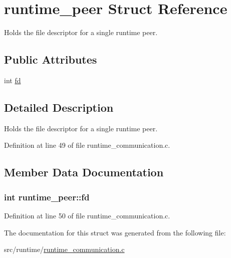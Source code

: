 \hypertarget{structruntime__peer}{\section{runtime\-\_\-peer Struct Reference}
\label{structruntime__peer}
}


Holds the file descriptor for a single runtime peer.  


\subsection*{Public Attributes}
\begin{DoxyCompactItemize}
\item 
int \hyperlink{structruntime__peer_a1d013fd0bf36999603d22509df266e38}{fd}
\end{DoxyCompactItemize}


\subsection{Detailed Description}
Holds the file descriptor for a single runtime peer. 

Definition at line 49 of file runtime\-\_\-communication.\-c.



\subsection{Member Data Documentation}
\hypertarget{structruntime__peer_a1d013fd0bf36999603d22509df266e38}{
\subsubsection[{fd}]{\setlength{\rightskip}{0pt plus 5cm}int runtime\-\_\-peer\-::fd}}\label{structruntime__peer_a1d013fd0bf36999603d22509df266e38}


Definition at line 50 of file runtime\-\_\-communication.\-c.



The documentation for this struct was generated from the following file\-:\begin{DoxyCompactItemize}
\item 
src/runtime/\hyperlink{runtime_2runtime__communication_8c}{runtime\-\_\-communication.\-c}\end{DoxyCompactItemize}
